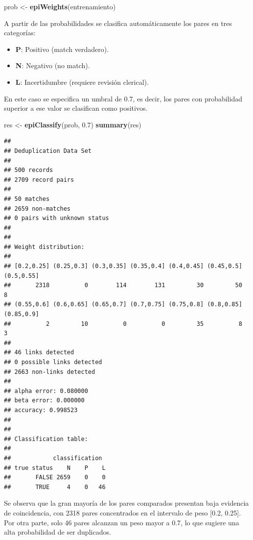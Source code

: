 \documentclass[
  12pt,
]{book}
\newenvironment{Shaded}{\begin{snugshade}}{\end{snugshade}}
\newcommand{\FloatTok}[1]{\textcolor[rgb]{0.00,0.00,0.81}{#1}}
\newcommand{\FunctionTok}[1]{\textcolor[rgb]{0.13,0.29,0.53}{\textbf{#1}}}
\newcommand{\NormalTok}[1]{#1}
\newcommand{\OtherTok}[1]{\textcolor[rgb]{0.56,0.35,0.01}{#1}}
\providecommand{\tightlist}{%
  \setlength{\itemsep}{0pt}\setlength{\parskip}{0pt}}
\begin{document}
\begin{Shaded}
\begin{Highlighting}[]
\NormalTok{prob }\OtherTok{\textless{}{-}} \FunctionTok{epiWeights}\NormalTok{(entrenamiento)}
\end{Highlighting}
\end{Shaded}

A partir de las probabilidades se clasifica automáticamente los pares en tres categorías:

\begin{itemize}
\tightlist
\item
  \textbf{P}: Positivo (match verdadero).
\item
  \textbf{N}: Negativo (no match).
\item
  \textbf{L}: Incertidumbre (requiere revisión clerical).
\end{itemize}

En este caso se especifica un umbral de 0.7, es decir, los pares con probabilidad superior a ese valor se clasifican como positivos.

\begin{Shaded}
\begin{Highlighting}[]
\NormalTok{res }\OtherTok{\textless{}{-}} \FunctionTok{epiClassify}\NormalTok{(prob, }\FloatTok{0.7}\NormalTok{)}
\FunctionTok{summary}\NormalTok{(res)}
\end{Highlighting}
\end{Shaded}

\begin{verbatim}
## 
## Deduplication Data Set
## 
## 500 records 
## 2709 record pairs 
## 
## 50 matches
## 2659 non-matches
## 0 pairs with unknown status
## 
## 
## Weight distribution:
## 
## [0.2,0.25] (0.25,0.3] (0.3,0.35] (0.35,0.4] (0.4,0.45] (0.45,0.5] (0.5,0.55] 
##       2318          0        114        131         30         50          8 
## (0.55,0.6] (0.6,0.65] (0.65,0.7] (0.7,0.75] (0.75,0.8] (0.8,0.85] (0.85,0.9] 
##          2         10          0          0         35          8          3 
## 
## 46 links detected 
## 0 possible links detected 
## 2663 non-links detected 
## 
## alpha error: 0.080000
## beta error: 0.000000
## accuracy: 0.998523
## 
## 
## Classification table:
## 
##            classification
## true status    N    P    L
##       FALSE 2659    0    0
##       TRUE     4    0   46
\end{verbatim}

Se observa que la gran mayoría de los pares comparados presentan baja evidencia de coincidencia, con 2318 pares concentrados en el intervalo de peso {[}0.2, 0.25{]}. Por otra parte, solo 46 pares alcanzan un peso mayor a 0.7, lo que sugiere una alta probabilidad de ser duplicados.
\end{document}
